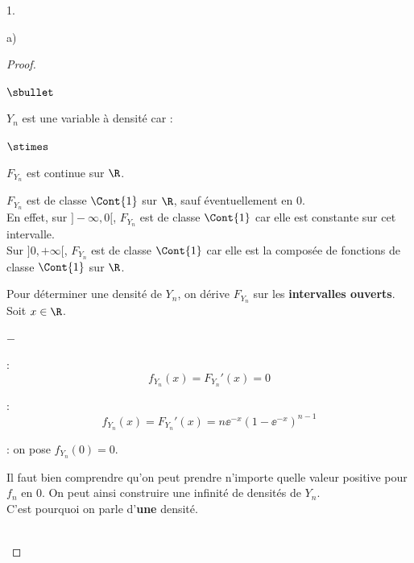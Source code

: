 \documentclass[11pt]{article}%
\begin{document}
\begin{noliste}{1.}
\begin{noliste}{a)}
    \begin{proof}~
      \begin{noliste}{$\sbullet$}
      \item $Y_n$ est une variable à densité car :
        \begin{noliste}{$\stimes$}
	\item $F_{Y_n}$ est continue sur $\R$.
	\item $F_{Y_n}$ est de classe $\Cont{1}$ sur $\R$, sauf
          éventuellement en $0$.\\[.2cm]
          En effet, sur $]-\infty,0[$, $F_{Y_n}$ est de classe
          $\Cont{1}$ car elle est constante sur cet intervalle.\\
          Sur $]0,+\infty[$, $F_{Y_n}$ est de classe $\Cont{1}$ car
          elle est la composée de fonctions de classe $\Cont{1}$ sur
          $\R$.
        \end{noliste}
      
      \item Pour déterminer une densité de $Y_n$, on dérive $F_{Y_n}$
        sur les {\bf intervalles ouverts}.\\
        Soit $x \in \R$. 
        \begin{noliste}{$-$}
        \item \dashuline{Si $x\in \ ]-\infty,0[$} :
          \[
          f_{Y_n}(x) = F_{Y_n}'(x) = 0
          \]
          
        \item \dashuline{Si $x\in \ ]0,+\infty[$} : 
          \[
          f_{Y_n}(x) = F_{Y_n}'(x) = n\ee^{-x}(1-\ee^{-x})^{n-1}
          \]
          
        \item {} : on pose $f_{Y_n}(0)=0$.
        \end{noliste}
      \end{noliste}
      \begin{remark}%
        Il faut bien comprendre qu'on peut prendre n'importe quelle
        valeur positive pour $f_n$ en $0$. On peut ainsi construire
        une infinité de densités de $Y_n$. \\
        C'est pourquoi on parle d'{\bf une} densité.
      \end{remark}~\\[-1.2cm]
    \end{proof}
  \end{noliste}
  

\end{noliste}
\end{document}
